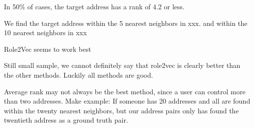 \documentclass[12pt,a4paper,titlepage,oneside,english]{article}
\begin{document}
In 50\% of cases, the target address has a rank of 4.2 or less.

We find the target address within the 5 nearest neighbors in xxx.
and within the 10 nearest neighbors in xxx

Role2Vec seems to work best

Still small sample, we cannot definitely say that role2vec is clearly better than the other methods. Luckily all methods are good.

Average rank may not always be the best method, since a user can control more than two addresses. Make example: If someone has 20 addresses and all are found within the twenty nearest neighbors, but our address pairs only has found the twentieth address as a ground truth pair.


\end{document}
